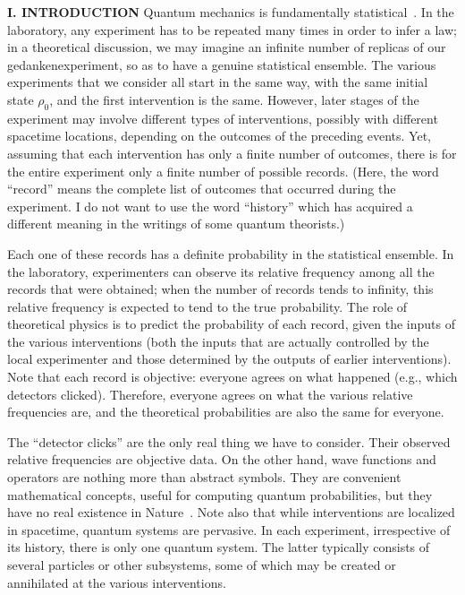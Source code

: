 \begin{center}{\bf I. INTRODUCTION}
Quantum mechanics is fundamentally statistical~\cite{Bal}. In the
laboratory, any experiment has to be repeated many times in order to
infer a law; in a theoretical discussion, we may imagine an infinite
number of replicas of our gedanken\-experiment, so as to have a genuine
statistical ensemble. The various experiments that we consider all start
in the same way, with the same initial state $\rho_0$, and the first
intervention is the same. However, later stages of the experiment may
involve different types of interventions, possibly with different
spacetime locations, depending on the outcomes of the preceding events.
Yet, assuming that each intervention has only a finite number of
outcomes, there is for the entire experiment only a finite number of
possible records. (Here, the word ``record'' means the complete list of
outcomes that occurred during the experiment. I do not want to use the
word ``history'' which has acquired a different meaning in the writings
of some quantum theorists.)

Each one of these records has a definite probability in the statistical
ensemble. In the laboratory, experimenters can observe its relative
frequency among all the records that were obtained; when the number of
records tends to infinity, this relative frequency is expected to tend
to the true probability. The role of theoretical physics is to predict
the probability of each record, given the inputs of the various
interventions (both the inputs that are actually controlled by the local
experimenter and those determined by the outputs of earlier
interventions). Note that each record is objective: everyone agrees on
what happened (e.g., which detectors clicked). Therefore, everyone
agrees on what the various relative frequencies are, and the theoretical
probabilities are also the same for everyone.

The ``detector clicks'' are the only real thing we have to consider.
Their observed relative frequencies are objective data. On the other
hand, wave functions and operators are nothing more than abstract
symbols. They are convenient mathematical concepts, useful for computing
quantum probabilities, but they have no real existence in
Nature~\cite{Stapp}. Note also that while interventions are localized in
spacetime, quantum systems are pervasive. In each experiment,
irrespective of its history, there is only one quantum system. The
latter typically consists of several particles or other subsystems, some
of which may be created or annihilated at the various interventions.


\end{center}

